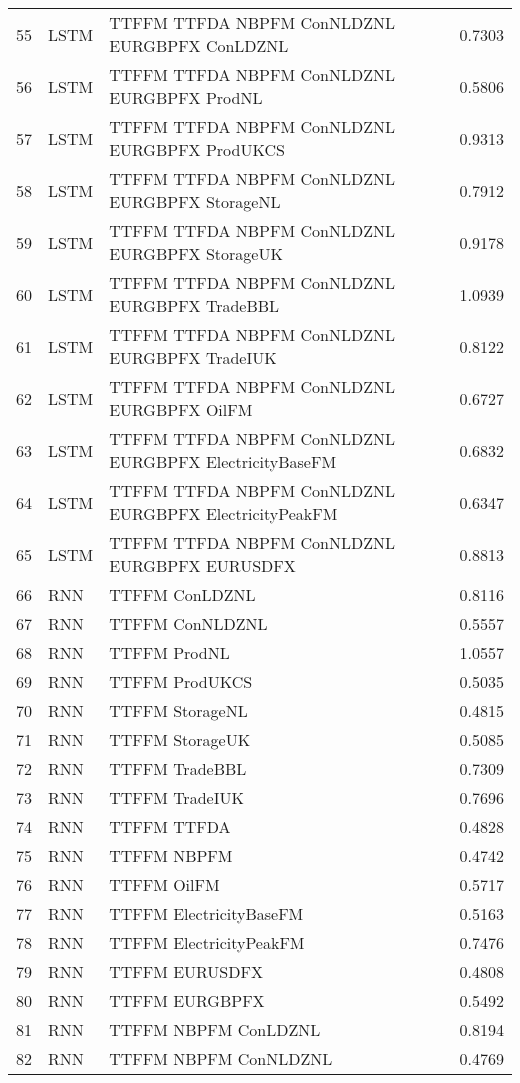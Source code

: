 \begin{table}[ht]
\begin{tabular}{rllr}
  55 & LSTM & TTFFM TTFDA NBPFM ConNLDZNL EURGBPFX ConLDZNL & 0.7303 \\ 
  56 & LSTM & TTFFM TTFDA NBPFM ConNLDZNL EURGBPFX ProdNL & 0.5806 \\ 
  57 & LSTM & TTFFM TTFDA NBPFM ConNLDZNL EURGBPFX ProdUKCS & 0.9313 \\ 
  58 & LSTM & TTFFM TTFDA NBPFM ConNLDZNL EURGBPFX StorageNL & 0.7912 \\ 
  59 & LSTM & TTFFM TTFDA NBPFM ConNLDZNL EURGBPFX StorageUK & 0.9178 \\ 
  60 & LSTM & TTFFM TTFDA NBPFM ConNLDZNL EURGBPFX TradeBBL & 1.0939 \\ 
  61 & LSTM & TTFFM TTFDA NBPFM ConNLDZNL EURGBPFX TradeIUK & 0.8122 \\ 
  62 & LSTM & TTFFM TTFDA NBPFM ConNLDZNL EURGBPFX OilFM & 0.6727 \\ 
  63 & LSTM & TTFFM TTFDA NBPFM ConNLDZNL EURGBPFX ElectricityBaseFM & 0.6832 \\ 
  64 & LSTM & TTFFM TTFDA NBPFM ConNLDZNL EURGBPFX ElectricityPeakFM & 0.6347 \\ 
  65 & LSTM & TTFFM TTFDA NBPFM ConNLDZNL EURGBPFX EURUSDFX & 0.8813 \\ 
  66 & RNN & TTFFM ConLDZNL & 0.8116 \\ 
  67 & RNN & TTFFM ConNLDZNL & 0.5557 \\ 
  68 & RNN & TTFFM ProdNL & 1.0557 \\ 
  69 & RNN & TTFFM ProdUKCS & 0.5035 \\ 
  70 & RNN & TTFFM StorageNL & 0.4815 \\ 
  71 & RNN & TTFFM StorageUK & 0.5085 \\ 
  72 & RNN & TTFFM TradeBBL & 0.7309 \\ 
  73 & RNN & TTFFM TradeIUK & 0.7696 \\ 
  74 & RNN & TTFFM TTFDA & 0.4828 \\ 
  75 & RNN & TTFFM NBPFM & 0.4742 \\ 
  76 & RNN & TTFFM OilFM & 0.5717 \\ 
  77 & RNN & TTFFM ElectricityBaseFM & 0.5163 \\ 
  78 & RNN & TTFFM ElectricityPeakFM & 0.7476 \\ 
  79 & RNN & TTFFM EURUSDFX & 0.4808 \\ 
  80 & RNN & TTFFM EURGBPFX & 0.5492 \\ 
  81 & RNN & TTFFM NBPFM ConLDZNL & 0.8194 \\ 
  82 & RNN & TTFFM NBPFM ConNLDZNL & 0.4769 \\ 

\end{tabular}
\end{table}
